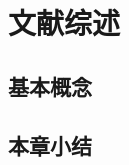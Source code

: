 
\ifx\atempxetex\usewhat
\fi
{}

\chapter{文献综述}
\label{cha2:literature_review}


\section{基本概念}
\label{sec2:basic_concepts}


\section{本章小结}
\label{sec2:conclusion}

